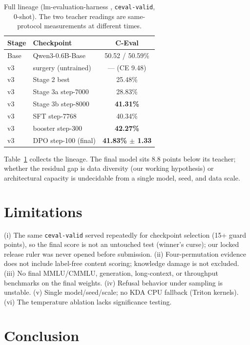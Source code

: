 \documentclass[11pt]{article}
\begin{document}
\begin{table}[t]
\centering
\small
\begin{tabular}{@{}llc@{}}
\toprule
Stage & Checkpoint & C-Eval \\
\midrule
Base & Qwen3-0.6B-Base & 50.52 / 50.59\% \\
v3 & surgery (untrained) & --- (CE 9.48) \\
v3 & Stage 2 best & 25.48\% \\
v3 & Stage 3a step-7000 & 28.83\% \\
v3 & Stage 3b step-8000 & \textbf{41.31\%} \\
v3 & SFT step-7768 & 40.34\% \\
v3 & booster step-300 & \textbf{42.27\%} \\
v3 & DPO step-100 (final) & \textbf{41.83\% $\pm$ 1.33} \\
\bottomrule
\end{tabular}
\caption{Full lineage (lm-evaluation-harness \citep{eval-harness},
\texttt{ceval-valid}, 0-shot). The two teacher readings are
same-protocol measurements at different times.}
\label{tab:lineage}
\end{table}

Table~\ref{tab:lineage} collects the lineage. The final model sits
8.8 points below its teacher; whether the residual gap is data diversity
(our working hypothesis) or architectural capacity is undecidable from a
single model, seed, and data scale.

\section{Limitations}
\label{sec:limits}

(i) The same \texttt{ceval-valid} served repeatedly for checkpoint
selection (15+ guard points), so the final score is not an untouched
test (winner's curse); our locked release ruler was never opened before
submission. (ii) Four-permutation evidence does not include label-free
content scoring; knowledge damage is not excluded. (iii) No final
MMLU/CMMLU, generation, long-context, or throughput benchmarks on the
final weights. (iv) Refusal behavior under sampling is unstable.
(v) Single model/seed/scale; no KDA CPU fallback (Triton kernels).
(vi) The temperature ablation lacks significance testing.

\section{Conclusion}
\end{document}
